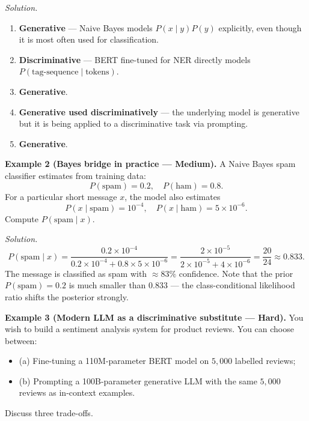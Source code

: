 \documentclass[12pt,a4paper]{report}
\theoremstyle{definition}
\theoremstyle{remark}
\begin{document}
\textit{Solution.}
\begin{enumerate}
    \item \textbf{Generative} --- Naive Bayes models $P(x \mid y) P(y)$ explicitly, even though it is most often used for classification.
    \item \textbf{Discriminative} --- BERT fine-tuned for NER directly models $P(\text{tag-sequence} \mid \text{tokens})$.
    \item \textbf{Generative}.
    \item \textbf{Generative used discriminatively} --- the underlying model is generative but it is being applied to a discriminative task via prompting.
    \item \textbf{Generative}.
\end{enumerate}

\medskip

\textbf{Example 2 (Bayes bridge in practice --- Medium).}
A Naive Bayes spam classifier estimates from training data:
\[ P(\text{spam}) = 0.2, \quad P(\text{ham}) = 0.8. \]
For a particular short message $x$, the model also estimates
\[ P(x \mid \text{spam}) = 10^{-4}, \quad P(x \mid \text{ham}) = 5 \times 10^{-6}. \]
Compute $P(\text{spam} \mid x)$.

\textit{Solution.}
\[ P(\text{spam} \mid x) = \frac{0.2 \times 10^{-4}}{0.2 \times 10^{-4} + 0.8 \times 5 \times 10^{-6}} = \frac{2 \times 10^{-5}}{2 \times 10^{-5} + 4 \times 10^{-6}} = \frac{20}{24} \approx 0.833. \]
The message is classified as spam with $\approx 83\%$ confidence. Note that the prior $P(\text{spam}) = 0.2$ is much smaller than $0.833$ --- the class-conditional likelihood ratio shifts the posterior strongly.

\medskip

\textbf{Example 3 (Modern LLM as a discriminative substitute --- Hard).}
You wish to build a sentiment analysis system for product reviews. You can choose between:
\begin{itemize}
    \item (a) Fine-tuning a 110M-parameter BERT model on $5{,}000$ labelled reviews;
    \item (b) Prompting a 100B-parameter generative LLM with the same $5{,}000$ reviews as in-context examples.
\end{itemize}
Discuss three trade-offs.
\end{document}
